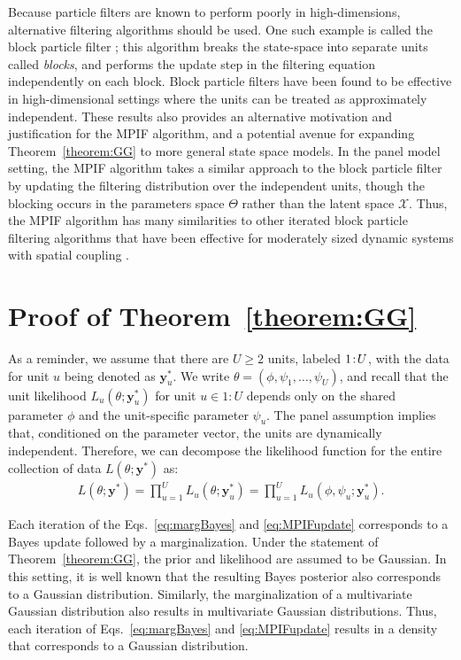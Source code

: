 \documentclass[12pt]{article}\usepackage[]{graphicx}\usepackage[]{xcolor}
\begin{document}
\begin{appendices}
Because particle filters are known to perform poorly in high-dimensions, alternative filtering algorithms should be used.
One such example is called the block particle filter \citep{rebeschini15}; this algorithm breaks the state-space into separate units called \emph{blocks}, and performs the update step in the filtering equation independently on each block.
Block particle filters have been found to be effective in high-dimensional settings where the units can be treated as approximately independent.
These results also provides an alternative motivation and justification for the MPIF algorithm, and a potential avenue for expanding Theorem~\ref{theorem:GG} to more general state space models.
In the panel model setting, the MPIF algorithm takes a similar approach to the block particle filter by updating the filtering distribution over the independent units, though the blocking occurs in the parameters space $\Theta$ rather than the latent space $\mathcal{X}$.
Thus, the MPIF algorithm has many similarities to other iterated block particle filtering algorithms that have been effective for moderately sized dynamic systems with spatial coupling \citep{ning23,ionides24}.

\section{Proof of Theorem~\ref{theorem:GG}}\label{appendix:Gaus}

As a reminder, we assume that there are $U\geq 2$ units, labeled ${1}\!:\!{U}$, with the data for unit $u$ being denoted as $\bm{y}^*_u$.
We write $\theta = (\phi, \psi_1, \ldots, \psi_U)$, and recall that the unit likelihood $L_{u}(\theta;\bm{y}^*_u)$ for unit $u \in 1:U$ depends only on the shared parameter $\phi$ and the unit-specific parameter $\psi_u$.
The panel assumption implies that, conditioned on the parameter vector, the units are dynamically independent.
Therefore, we can decompose the likelihood function for the entire collection of data $L(\theta; \bm{y}^*)$ as:
\begin{align*}
    L(\theta; \bm{y}^*) = \prod_{u = 1}^U L_u(\theta;\bm{y}_u^*) = \prod_{u = 1}^U L_u(\phi, \psi_u;\bm{y}_u^*).
\end{align*}

Each iteration of the Eqs.~\ref{eq:margBayes} and \ref{eq:MPIFupdate} corresponds to a Bayes update followed by a marginalization.
Under the statement of Theorem~\ref{theorem:GG}, the prior and likelihood are assumed to be Gaussian.
In this setting, it is well known that the resulting Bayes posterior also corresponds to a Gaussian distribution.
Similarly, the marginalization of a multivariate Gaussian distribution also results in multivariate Gaussian distributions.
Thus, each iteration of Eqs.~\ref{eq:margBayes} and \ref{eq:MPIFupdate} results in a density that corresponds to a Gaussian distribution.


\end{appendices}
\end{document}
